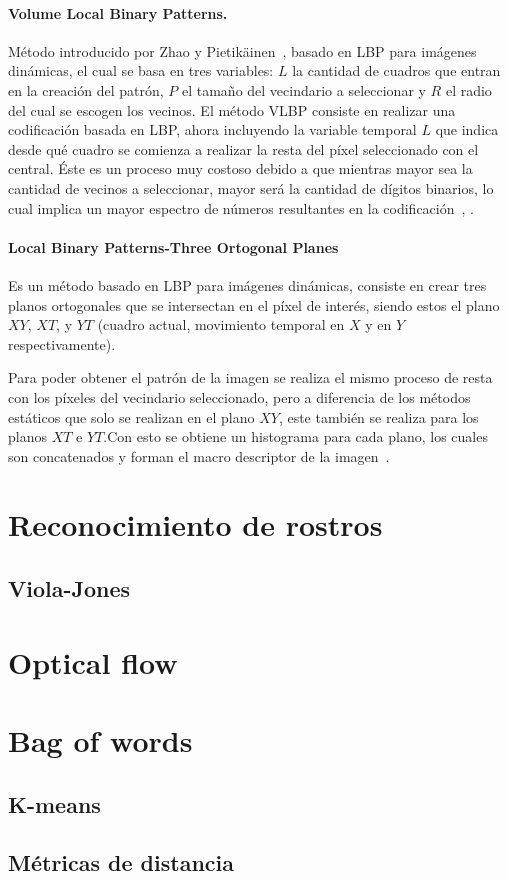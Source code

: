 		\paragraph{Volume Local Binary Patterns.}
		\label{sec:vlbp}
		Método introducido por Zhao y Pietikäinen~\cite{Zhao2006}, basado en LBP para imágenes dinámicas, el cual se basa en tres variables: $L$ la cantidad de cuadros que entran en la creación del patrón, $P$ el tamaño del vecindario a seleccionar y $R$ el radio del cual se escogen los vecinos. 
El método VLBP consiste en realizar una codificación basada en LBP, ahora incluyendo la variable temporal $L$ que indica desde qué cuadro se comienza a realizar la resta del píxel seleccionado con el central.
Éste es un proceso muy costoso debido a que mientras mayor sea la cantidad de vecinos a seleccionar, mayor será la cantidad de dígitos binarios, lo cual implica un mayor espectro de números resultantes en la codificación~\cite{Zhao2007a}, \cite{Zhao2007}.

		\paragraph{Local Binary Patterns-Three Ortogonal Planes}
		\label{sec:lbp-top}
		 Es un método basado en LBP para imágenes dinámicas, consiste en crear tres planos ortogonales que se intersectan en el píxel de interés, siendo estos el plano $XY$, $XT$, y $YT$ (cuadro actual, movimiento temporal en $X$ y en $Y$ respectivamente). 

Para poder obtener el patrón de la imagen se realiza el mismo proceso de resta con los píxeles del vecindario seleccionado, pero a diferencia de los métodos estáticos que solo se realizan en el plano $XY$, este también se realiza para los planos $XT$ e $YT$.\@ Con esto se obtiene un histograma para cada plano, los cuales son concatenados y forman el macro descriptor de la imagen~\cite{Zhao2007}.


\section{Reconocimiento de rostros}
\label{sec:rec_rostros}

	\subsection{Viola-Jones}
	\label{sec:viola-jones}

\section{Optical flow}
\label{sec:optical_flow}

\section{Bag of words}
\label{sec:bag_of_words}

	\subsection{K-means}
	\label{sec:k-means}
	
	\subsection{Métricas de distancia}
	\label{sec:matricas_de_distancia}
